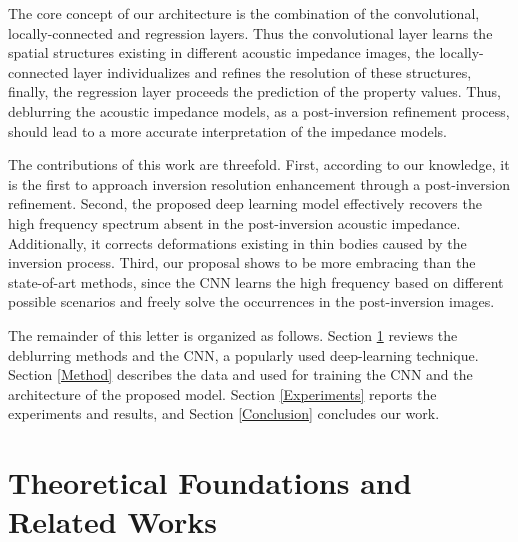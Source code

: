 \documentclass[journal]{IEEEtran}
\begin{document}
The core concept of our architecture is the combination of the
convolutional, locally-connected and regression layers. Thus
the convolutional layer learns the spatial structures existing
in different acoustic impedance images, the locally-connected
layer individualizes and refines the resolution of these structures,
finally, the regression layer proceeds the prediction of the property values.
Thus, deblurring the acoustic impedance models, as a post-inversion
refinement process, should lead to a more accurate interpretation
of the impedance models.

The contributions of this work are threefold. First,
according to our knowledge, it is the first to approach
inversion resolution enhancement through a post-inversion
refinement. Second, the proposed deep learning model
effectively recovers the high frequency spectrum absent
in the post-inversion acoustic impedance. Additionally, it
corrects deformations existing in thin bodies caused
by the inversion process. Third, our proposal
shows to be more embracing than the state-of-art
methods, since the CNN learns the high frequency
based on different possible scenarios and freely solve
the occurrences in the post-inversion images.

The remainder of this letter is organized as follows.
Section \ref{Theoretics} reviews the deblurring methods
and the CNN, a popularly used deep-learning technique.
Section \ref{Method} describes the data and used for
training the CNN and the architecture of the proposed model.
Section \ref{Experiments} reports the experiments and
results, and Section \ref{Conclusion} concludes our work.

\section{Theoretical Foundations and Related Works}\label{Theoretics}
\end{document}
